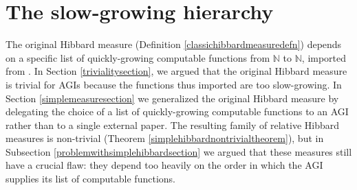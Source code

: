 \documentclass{article}
\begin{document}


\section{The slow-growing hierarchy}
\label{slowgrowinghierarchysection}

The original Hibbard measure
(Definition \ref{classichibbardmeasuredefn}) depends on a specific list of
quickly-growing computable functions from $\mathbb N$ to $\mathbb N$, imported from
\cite{liu1960enumeration}. In Section \ref{trivialitysection}, we argued
that the original Hibbard measure is trivial for AGIs because the functions thus imported
are too slow-growing.
In Section \ref{simplemeasuresection} we generalized
the original Hibbard measure
by delegating the choice of a list of quickly-growing computable functions to an AGI rather
than to a single external paper. The resulting family of relative Hibbard measures is
non-trivial (Theorem \ref{simplehibbardnontrivialtheorem}), but in
Subsection \ref{problemwithsimplehibbardsection} we argued that these
measures still have a crucial flaw: they depend too heavily on the order in which
the AGI supplies its list of computable functions.
\end{document}
